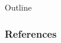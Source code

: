 \documentclass{beamer}
\date[Short Occasion] %
{Date / Occasion}
\begin{document}
\begin{frame}
  \titlepage
\end{frame}

\begin{frame}{Outline}
  \tableofcontents
\end{frame}






\begin{frame}
    \frametitle{References}
    
    
\end{frame}
\end{document}
